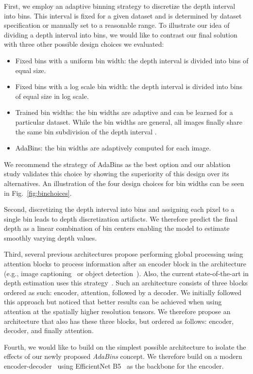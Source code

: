 \documentclass[final]{cvpr}
\begin{document}
First, we employ an adaptive binning strategy to discretize the depth interval  into  bins. This interval is fixed for a given dataset and is determined by dataset specification or manually set to a reasonable range. To illustrate our idea of dividing a depth interval into bins, we would like to contrast our final solution with three other possible design choices we evaluated: 
\begin{itemize}
\item Fixed bins with a uniform bin width: the depth interval  is divided into  bins of equal size.
\item Fixed bins with a log scale bin width: the depth interval  is divided into bins of equal size in log scale.
\item Trained bin widths: the bin widths are adaptive and can be learned for a particular dataset. While the bin widths are general, all images finally share the same bin subdivision of the depth interval .
\item AdaBins: the bin widths  are adaptively computed for each image.
\end{itemize}
We recommend the strategy of AdaBins as the best option and our ablation study validates this choice by showing the superiority of this design over its alternatives. An illustration of the four design choices for bin widths can be seen in Fig.~\ref{fig:binchoices}.

Second, discretizing the depth interval  into bins and assigning each pixel to a single bin leads to depth discretization artifacts. We therefore predict the final depth as a linear combination of bin centers enabling the model to estimate smoothly varying depth values. 

Third, several previous architectures propose performing global processing using attention blocks to process information after an encoder block in the architecture (e.g., image captioning~\cite{Cornia_2020_CVPR, transf_obj_NEURIPS2019_680390c5} or object detection~\cite{detr2020}). Also, the current state-of-the-art in depth estimation uses this strategy~\cite{dav_huynh2020guiding}. Such an architecture consists of three blocks ordered as such: encoder, attention, followed by a decoder. We initially followed this approach but noticed that better results can be achieved when using attention at the spatially higher resolution tensors. We therefore propose an architecture that also has these three blocks, but ordered as follows: encoder, decoder, and finally attention.

Fourth, we would like to build on the simplest possible architecture to isolate the effects of our newly proposed \emph{AdaBins} concept. We therefore build on a modern encoder-decoder~\cite{Alhashim2018} using EfficientNet B5~\cite{efficentnet_TanL19} as the backbone for the encoder.
\end{document}

